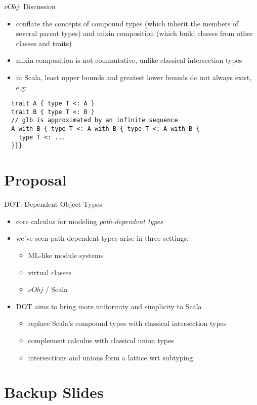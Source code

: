 \documentclass{beamer}
\begin{document}
\begin{frame}[fragile]{${\nu}Obj$: Discussion}
\begin{itemize}
\item conflate the concepts of compound types (which inherit the
  members of several parent types) and mixin composition (which build
  classes from other classes and traits)
\item mixin composition is not commutative, unlike classical
  intersection types
\item in Scala, least upper bounds and greatest lower bounds do not always exist, e.g: %
\end{itemize}
\begin{verbatim}
  trait A { type T <: A }
  trait B { type T <: B }
  // glb is approximated by an infinite sequence
  A with B { type T <: A with B { type T <: A with B {
    type T <: ...
  }}}
\end{verbatim}
\end{frame}

\section{Proposal}
\begin{frame}{DOT: Dependent Object Types}
\begin{itemize}
\item core calculus for modeling {\it path-dependent types}
\item we've seen path-dependent types arise in three settings:
\begin{itemize}
\item ML-like module systems
\item virtual classes
\item ${\nu}Obj$ / Scala
\end{itemize}
\item DOT aims to bring more uniformity and simplicity to Scala
\begin{itemize}
\item replace Scala's compound types with classical intersection types
\item complement calculus with classical union types
\item intersections and unions form a lattice wrt subtyping
\end{itemize}
\end{itemize}
\end{frame}

\section{Backup Slides}
\end{document}
